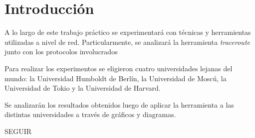 \section{Introducción}

A lo largo de este trabajo práctico se experimentará con técnicas 
y herramientas utilizadas a nivel de red. Particularmente, se analizará
la herramienta \textit{traceroute} junto con los protocolos involucrados

Para realizar los experimentos se eligieron cuatro universidades lejanas
del mundo: la Universidad Humboldt de Berlín, la Universidad de Moscú,
la Universidad de Tokio y la Universidad de Harvard.

Se analizarán los resultados obtenidos luego de aplicar la herramienta a
las distintas universidades a través de gráficos y diagramas.

SEGUIR

